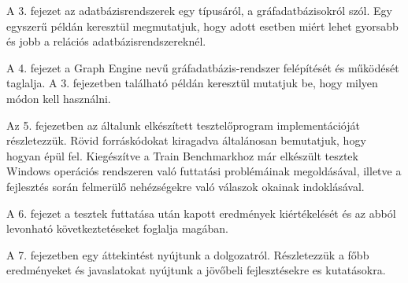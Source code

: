 A 3. fejezet az adatbázisrendszerek egy típusáról, a gráfadatbázisokról szól. Egy egyszerű példán keresztül megmutatjuk, hogy adott esetben miért lehet gyorsabb és jobb a relációs adatbázisrendszereknél.

A 4. fejezet a Graph Engine nevű gráfadatbázis-rendszer felépítését és működését taglalja. A 3. fejezetben található példán keresztül mutatjuk be, hogy milyen módon kell használni.

Az 5. fejezetben az általunk elkészített tesztelőprogram implementációját részletezzük. Rövid forráskódokat kiragadva általánosan bemutatjuk, hogy hogyan épül fel. Kiegészítve a Train Benchmarkhoz már elkészült tesztek Windows operációs rendszeren való futtatási problémáinak megoldásával, illetve a fejlesztés során felmerülő nehézségekre való válaszok okainak indoklásával.


A 6. fejezet a tesztek futtatása után kapott eredmények kiértékelését és az abból levonható következtetéseket foglalja magában.

A 7. fejezetben egy áttekintést nyújtunk a dolgozatról. Részletezzük a főbb eredményeket és javaslatokat nyújtunk a jövőbeli fejlesztésekre es kutatásokra.